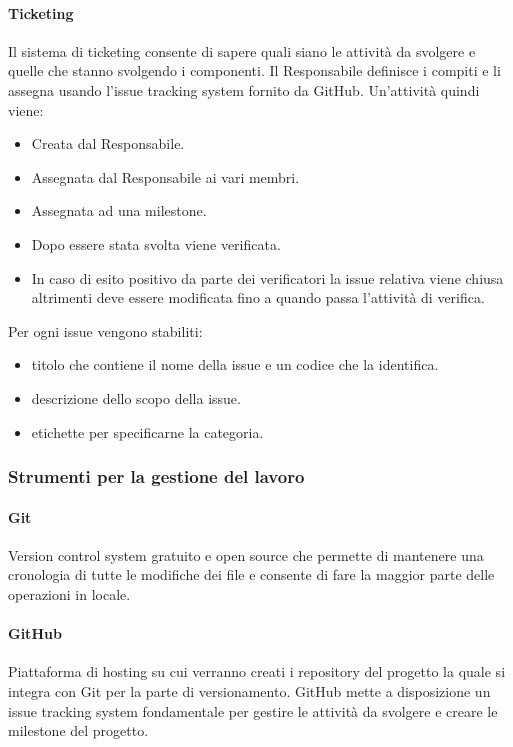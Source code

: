 \paragraph{Ticketing}
Il sistema di ticketing consente di sapere quali siano le attività da svolgere e quelle che stanno svolgendo i componenti.
Il Responsabile definisce i compiti e li assegna usando l'issue tracking system fornito da GitHub. Un'attività quindi viene:
\begin{itemize}
    \item Creata dal Responsabile.
    \item Assegnata dal Responsabile ai vari membri.
    \item Assegnata ad una milestone.
    \item Dopo essere stata svolta viene verificata.
    \item In caso di esito positivo da parte dei verificatori la issue relativa viene chiusa altrimenti deve essere modificata fino a quando passa l'attività di verifica. 
\end{itemize}
Per ogni issue vengono stabiliti:
\begin{itemize}
    \item titolo che contiene il nome della issue e un codice che la identifica.
    \item descrizione dello scopo della issue.
    \item etichette per specificarne la categoria.
\end{itemize}

\subsubsection{Strumenti per la gestione del lavoro}
\paragraph{Git}
Version control system gratuito e open source che permette di mantenere una cronologia di tutte le modifiche dei file e consente
di fare la maggior parte delle operazioni in locale.

\paragraph{GitHub}
Piattaforma di hosting su cui verranno creati i repository del progetto la quale si integra con Git per la parte di versionamento. 
GitHub mette a disposizione un issue tracking system fondamentale per gestire le attività da svolgere e creare le milestone del progetto.